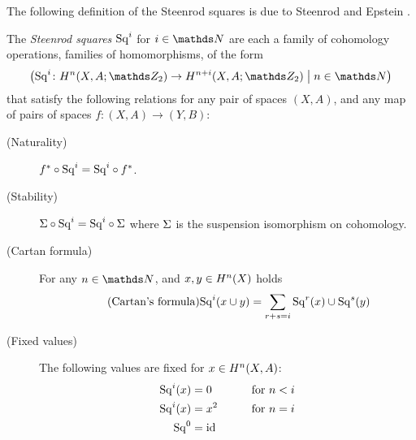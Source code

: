 The following definition of the Steenrod squares is due to
Steenrod and Epstein \cite[Chap.~I.1, p.~1]{steenrodepstein}.
\begin{Def}\label{def:sq}
  The \emph{Steenrod squares} $\mathrm{Sq}^{i}$ for $i\in\Nat$ are each a family
  of cohomology operations, \idest families of homomorphisms, of the
  form
  \begin{gather*}
    \left(
      \Sq i\colon \H^n(X, A;\Zmod2) \to \H^{n+i}(X, A;\Zmod2)
      \;\middle|\;
      n\in\Nat
    \right)
  \end{gather*}
  that satisfy the following relations for any pair of spaces $(X,A)$, and any map of
  pairs of spaces $f\colon (X,A)\to (Y,B)$:
  \begin{description}
  \item[(Naturality)]\label{item:sqnaturality}
    ${f}^*\circ\mathrm{Sq}^{i} = \mathrm{Sq}^{i}\circ{f}^*$.
  \item[(Stability)]\label{item:sqstability}
    $\Sigma\circ\mathrm{Sq}^{i} = \mathrm{Sq}^{i}\circ\Sigma$
    where $\Sigma$ is the suspension isomorphism on cohomology.
  \item[(Cartan formula)] For any $n\in\Nat$, and $x,y\in H^n(X)$ holds
    \begin{gather}\label{tag:cartan}\tag{Cartan's formula}
      \mathrm{Sq}^{i}(x\cup y) = \sum_{r+s=i}\mathrm{Sq}^{r}(x)\cup\mathrm{Sq}^{s}(y)
    \end{gather}
  \item[(Fixed values)] The following values are fixed for $x\in H^n(X,A)$:
    \begin{alignat}{4}
      \mathrm{Sq}^{i}(x) &= 0     & \qquad\text{for }n<i \label{eq:sqlowerbound}\\
      \mathrm{Sq}^{i}(x) &= x^2   & \qquad\text{for }n=i \label{eq:sqsquared}\\
      \mathrm{Sq}^{0}    &= \mathrm{id}_{}   \label{eq:sqidentity}
    \end{alignat}

\end{description}
\end{Def}
